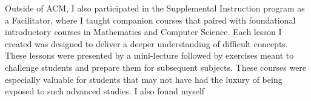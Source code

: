 \documentclass[12pt]{article}
\begin{document}
Outside of ACM, I also participated in the Supplemental Instruction program as a
Facilitator, where I taught companion courses that paired with foundational
introductory courses in Mathematics and Computer Science.  Each lesson I created
was designed to deliver a deeper understanding of difficult concepts.  These
lessons were presented by a mini-lecture followed by exercises meant to
challenge students and prepare them for subsequent subjects.  These courses were
especially valuable for students that may not have had the luxury of being
exposed to such advanced studies.  I also found myself 





\end{document}
